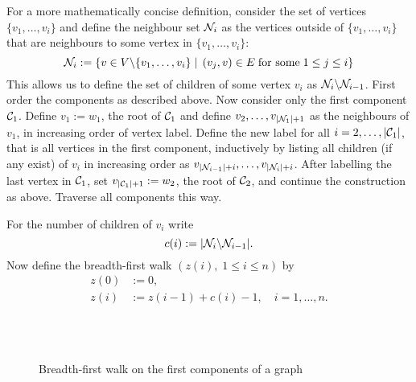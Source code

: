 For a more mathematically concise definition,
consider the set of vertices $\{ v_1,\dots, v_i \}$
and define the neighbour set $\mathcal{N}_{i}$ as the vertices outside of
$\{ v_1,\dots, v_i \}$ 
that are neighbours to some vertex in 
$\{ v_1,\dots, v_i \}$:
\begin{equation} \label{D: Ni}
\mathcal{N}_{i} := 
\left\lbrace v \in V \backslash \{ v_1,\dots, v_i \} 
\; | \; 
\left(v_j, v\right) \in E \; \text{for some} \; 1 \leq j \leq i \right\rbrace
\end{equation}
This allows us to define the set of children of some vertex $v_i$ as
$\mathcal{N}_{i} \backslash \mathcal{N}_{i-1}$.
First order the components as described above. 
Now consider only the first component $\mathcal{C}_{1}$.
Define $v_1 := w_1$, the root of $\mathcal{C}_{1}$ and define
$v_2, \dots , v_{|\mathcal{N}_{1}|+1}$ 
as the neighbours of $v_1$,
in increasing order of vertex label. 
Define the new label for all 
$i = 2, \dots, |\mathcal{C}_{1}|$,
that is all vertices in the first component,
inductively by listing all children (if any exist) of $v_i$
in increasing order as 
$ v_{|\mathcal{N}_{i-1}|+i}, \dots, v_{|\mathcal{N}_{i}|+i} $.
After labelling the last vertex in $\mathcal{C}_{1}$, set
$v_{|\mathcal{C}_{1}| + 1} := w_2$, 
the root of $\mathcal{C}_{2}$, and continue the construction as above.
Traverse all components this way.


For the number of children of $v_i$ write 
\begin{equation} \label{D: ci}
c(i) := |\mathcal{N}_{i} \backslash\mathcal{N}_{i-1}|.
\end{equation}
Now define the breadth-first walk 
$(z(i), \; 1 \leq i \leq n)$
by
\begin{equation} \label{E: def bf-walk z}
\begin{aligned}
z(0) &:= 0, \\
z(i) &:= z(i-1) + c(i) -1, \quad i=1, \dots , n.
\end{aligned}
\end{equation}



\begin{figure} [H]
	\centering
	\\
	
	\centering
	\\
	
	\centering
	
	\caption{Breadth-first walk on the first components of a graph}
	\label{F: bf-walk discrete}
\end{figure} 

